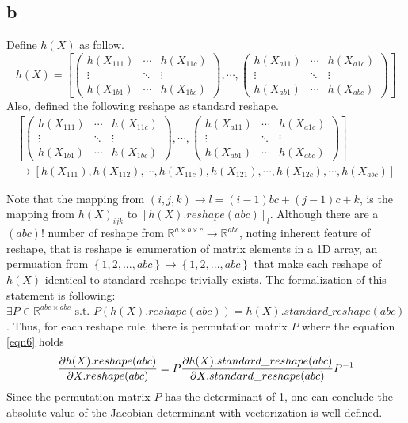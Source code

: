 \documentclass[10pt]{article}
\begin{document}
\subsection*{b}
Define $h(X)$ as follow.
\begin{equation}
    h(X) = \left[\begin{pmatrix}
        h(X_{111}) & \cdots & h(X_{11c}) \\
        \vdots & \ddots & \vdots \\ 
        h(X_{1b1}) & \cdots & h(X_{1bc})
    \end{pmatrix}, \cdots, \begin{pmatrix}
        h(X_{a11}) & \cdots & h(X_{a1c}) \\
        \vdots & \ddots & \vdots \\ 
        h(X_{ab1}) & \cdots & h(X_{abc})
    \end{pmatrix} \right]
\end{equation}
Also, defined the following reshape as standard reshape. 
\begin{align}
    \left[\begin{pmatrix}
        h(X_{111}) & \cdots & h(X_{11c}) \\
        \vdots & \ddots & \vdots \\ 
        h(X_{1b1}) & \cdots & h(X_{1bc})
    \end{pmatrix}, \cdots, \begin{pmatrix}
        h(X_{a11}) & \cdots & h(X_{a1c}) \\
        \vdots & \ddots & \vdots \\ 
        h(X_{ab1}) & \cdots & h(X_{abc})
    \end{pmatrix} \right] \\ \longrightarrow \left[ h(X_{111}), h(X_{112}), \cdots, h(X_{11c}), h(X_{121}), \cdots, h(X_{12c}), \cdots, h(X_{abc})\right]
\end{align}

Note that the mapping from $(i,j,k) \rightarrow l = (i-1)bc + (j-1)c + k$, is the mapping from $h(X)_{ijk}$ to $[h(X).reshape(abc)]_l$.
Although there are a $(abc)!$ number of reshape from $\mathbb{R}^{a\times b\times c} \rightarrow \mathbb{R}^{abc}$, noting inherent feature of reshape, that is reshape is enumeration of matrix elements in a 1D array,
an permuation from $\left\{1, 2, ..., abc\right\} \rightarrow \left\{1, 2, ..., abc\right\}$ that make each reshape of $h(X)$ identical to standard reshape trivially exists. 
The formalization of this statement is following: $\exists P\in \mathbb{R}^{abc \times abc} \text{ s.t. } P(h(X).reshape(abc)) = h(X).standard\_reshape(abc)$.
Thus, for each reshape rule, there is permutation matrix $P$ where the equation \ref{eqn6} holds
\begin{equation}
    {\partial h(X).reshape(abc) \over \partial X.reshape(abc)} = P{\partial h(X).standard\_reshape(abc) \over \partial X.standard\_reshape(abc)}P^{-1}
    \label{eqn6}
\end{equation}
Since the permutation matrix $P$ has the determinant of 1, one can conclude the absolute value of the Jacobian determinant with vectorization is well defined. 
\end{document}

